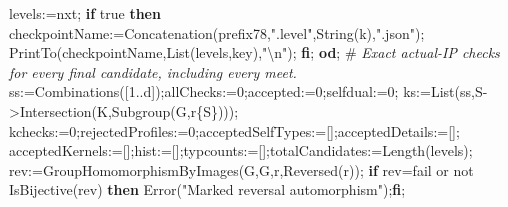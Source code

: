 \documentclass[
  10pt,
  letterpaper,
]{article}
\newenvironment{Shaded}{}{}
\newcommand{\BuiltInTok}[1]{\textcolor[rgb]{0.00,0.50,0.00}{#1}}
\newcommand{\CommentTok}[1]{\textcolor[rgb]{0.38,0.63,0.69}{\textit{#1}}}
\newcommand{\ConstantTok}[1]{\textcolor[rgb]{0.53,0.00,0.00}{#1}}
\newcommand{\ControlFlowTok}[1]{\textcolor[rgb]{0.00,0.44,0.13}{\textbf{#1}}}
\newcommand{\FloatTok}[1]{\textcolor[rgb]{0.25,0.63,0.44}{#1}}
\newcommand{\NormalTok}[1]{#1}
\newcommand{\OperatorTok}[1]{\textcolor[rgb]{0.40,0.40,0.40}{#1}}
\newcommand{\StringTok}[1]{\textcolor[rgb]{0.25,0.44,0.63}{#1}}
\newcommand{\VariableTok}[1]{\textcolor[rgb]{0.10,0.09,0.49}{#1}}
\begin{document}
\begin{Shaded}
\begin{Highlighting}[]
  \VariableTok{levels}\OperatorTok{:=}\VariableTok{nxt}\OperatorTok{;}
  \ControlFlowTok{if} \ConstantTok{true} \ControlFlowTok{then}
   \VariableTok{checkpointName}\OperatorTok{:=}\BuiltInTok{Concatenation}\NormalTok{(}\VariableTok{prefix78}\OperatorTok{,}\StringTok{".level"}\OperatorTok{,}\BuiltInTok{String}\NormalTok{(}\VariableTok{k}\NormalTok{)}\OperatorTok{,}\StringTok{".json"}\NormalTok{)}\OperatorTok{;}
   \BuiltInTok{PrintTo}\NormalTok{(}\VariableTok{checkpointName}\OperatorTok{,}\BuiltInTok{List}\NormalTok{(}\VariableTok{levels}\OperatorTok{,}\VariableTok{key}\NormalTok{)}\OperatorTok{,}\StringTok{"\textbackslash{}n"}\NormalTok{)}\OperatorTok{;}
  \ControlFlowTok{fi}\OperatorTok{;}
 \ControlFlowTok{od}\OperatorTok{;}
\NormalTok{ \#}\CommentTok{ Exact actual{-}IP checks for every final candidate, including every meet.}
 \VariableTok{ss}\OperatorTok{:=}\BuiltInTok{Combinations}\NormalTok{([}\FloatTok{1}\OperatorTok{..}\VariableTok{d}\NormalTok{])}\OperatorTok{;}\VariableTok{allChecks}\OperatorTok{:=}\FloatTok{0}\OperatorTok{;}\VariableTok{accepted}\OperatorTok{:=}\FloatTok{0}\OperatorTok{;}\VariableTok{selfdual}\OperatorTok{:=}\FloatTok{0}\OperatorTok{;}
 \VariableTok{ks}\OperatorTok{:=}\BuiltInTok{List}\NormalTok{(}\VariableTok{ss}\OperatorTok{,}\VariableTok{S}\OperatorTok{{-}\textgreater{}}\BuiltInTok{Intersection}\NormalTok{(}\VariableTok{K}\OperatorTok{,}\BuiltInTok{Subgroup}\NormalTok{(}\VariableTok{G}\OperatorTok{,}\VariableTok{r}\NormalTok{\{}\VariableTok{S}\NormalTok{\})))}\OperatorTok{;}
 \VariableTok{kchecks}\OperatorTok{:=}\FloatTok{0}\OperatorTok{;}\VariableTok{rejectedProfiles}\OperatorTok{:=}\FloatTok{0}\OperatorTok{;}\VariableTok{acceptedSelfTypes}\OperatorTok{:=}\NormalTok{[]}\OperatorTok{;}\VariableTok{acceptedDetails}\OperatorTok{:=}\NormalTok{[]}\OperatorTok{;}
 \VariableTok{acceptedKernels}\OperatorTok{:=}\NormalTok{[]}\OperatorTok{;}\VariableTok{hist}\OperatorTok{:=}\NormalTok{[]}\OperatorTok{;}\VariableTok{typcounts}\OperatorTok{:=}\NormalTok{[]}\OperatorTok{;}\VariableTok{totalCandidates}\OperatorTok{:=}\BuiltInTok{Length}\NormalTok{(}\VariableTok{levels}\NormalTok{)}\OperatorTok{;}
 \VariableTok{rev}\OperatorTok{:=}\BuiltInTok{GroupHomomorphismByImages}\NormalTok{(}\VariableTok{G}\OperatorTok{,}\VariableTok{G}\OperatorTok{,}\VariableTok{r}\OperatorTok{,}\BuiltInTok{Reversed}\NormalTok{(}\VariableTok{r}\NormalTok{))}\OperatorTok{;}
 \ControlFlowTok{if} \VariableTok{rev}\OperatorTok{=}\ConstantTok{fail} \ConstantTok{or} \ConstantTok{not} \BuiltInTok{IsBijective}\NormalTok{(}\VariableTok{rev}\NormalTok{) }\ControlFlowTok{then} \BuiltInTok{Error}\NormalTok{(}\StringTok{"Marked reversal automorphism"}\NormalTok{)}\OperatorTok{;}\ControlFlowTok{fi}\OperatorTok{;}

\end{Highlighting}
\end{Shaded}
\end{document}
